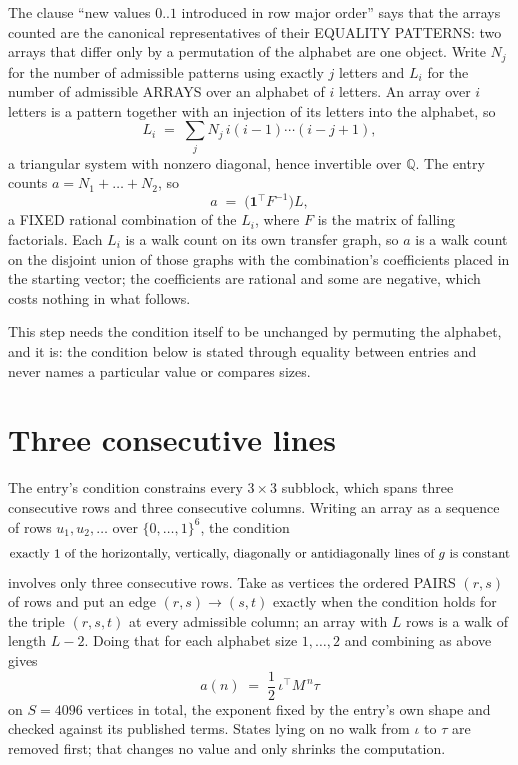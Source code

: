 \documentclass[11pt,a4paper]{article}
\theoremstyle{plain}
\theoremstyle{definition}
\begin{document}
The clause ``new values $0..1$ introduced in row major order'' says that the arrays
counted are the canonical representatives of their EQUALITY PATTERNS: two arrays that differ
only by a permutation of the alphabet are one object. Write $N_j$ for the number of admissible
patterns using exactly $j$ letters and $L_i$ for the number of admissible ARRAYS over an
alphabet of $i$ letters. An array over $i$ letters is a pattern together with an injection of
its letters into the alphabet, so
\[
L_i\;=\;\sum_{j}N_j\,i(i-1)\cdots(i-j+1),
\]
a triangular system with nonzero diagonal, hence invertible over $\mathbb{Q}$. The entry
counts $a=N_1+\dots+N_{2}$, so
\[
a\;=\;\bigl(\mathbf{1}^{\!\top}F^{-1}\bigr)L ,
\]
a FIXED rational combination of the $L_i$, where $F$ is the matrix of falling factorials.
Each $L_i$ is a walk count on its own transfer graph, so $a$ is a walk count on the disjoint
union of those graphs with the combination's coefficients placed in the starting vector; the
coefficients are rational and some are negative, which costs nothing in what follows.

This step needs the condition itself to be unchanged by permuting the alphabet, and it is:
the condition below is stated through equality between entries and never names a particular
value or compares sizes.

\section{Three consecutive lines}

The entry's condition constrains every $3\times3$ subblock, which spans three consecutive
rows and three consecutive columns. Writing an array as a sequence of rows
$u_1,u_2,\dots$ over $\{0,\dots,1\}^{6}$, the condition
\[
\text{exactly }1\text{ of the horizontally, vertically, diagonally or antidiagonally lines of }g\text{ \text{is constant}}
\]
involves only three consecutive rows. Take as vertices the ordered PAIRS $(r,s)$ of
rows and put an edge $(r,s)\to(s,t)$ exactly when the condition holds for the triple
$(r,s,t)$ at every admissible column; an array with $L$ rows is a walk of length $L-2$.
Doing that for each alphabet size $1,\dots,2$ and combining as above gives
\[
a(n)\;=\;\frac{1}{2}\,\iota^{\!\top}M^{\,n}\tau
\]
on $S=4096$ vertices in total, the exponent fixed by the entry's own shape and checked against
its published terms. States lying on no walk from $\iota$ to $\tau$ are removed first; that
changes no value and only shrinks the computation.
\end{document}
